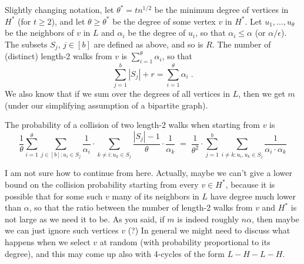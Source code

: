 \documentclass{article}
\newcommand{\eps}{\epsilon}
\begin{document}
Slightly changing notation, let $\theta^* = tn^{1/2}$ be the minimum degree of vertices in $H^*$ (for $t \geq 2$), and let $\theta \geq \theta^*$ be the degree of some vertex $v$ in $H^*$. Let $u_1,\dots,u_\theta$ be the neighbors of $v$ in $L$ and $\alpha_i$ be the degree of  $u_i$, so that $\alpha_i \leq \alpha$ (or $\alpha/\eps$). The subsets $S_j$, $j \in [b]$ are defined as above, and so is $R$.
The number of (distinct) length-2 walks from $v$ is $\sum_{i=1}^\theta \alpha_i$, so that 
\begin{equation}\label{eq:num-of-walks-gen}
\sum_{j=1}^b |S_j| + r = \sum_{i=1}^\theta \alpha_i\;.
\end{equation}
We also know that if we sum over the degrees of all vertices in $L$, then we get $m$ (under our simplifying assumption of a bipartite graph).

The probability of a collision of two length-2 walks when starting from $v$ is
%
\begin{equation}
\frac{1}{\theta}\sum_{i=1}^{\theta}  \sum_{j\in [b]: u_i \in S_j} \frac{1}{\alpha_i} \cdot 
\sum_{k\neq i: u_k \in S_j} \frac{|S_j|-1}{\theta}\cdot \frac{1}{\alpha_k} \;=\; \frac{1}{\theta^2} 
\cdot \sum_{j=1}^b \sum_{i\neq k: u_i,u_k\in S_j} \frac{1}{\alpha_i\cdot\alpha_k}
\label{eq:col-prob-gen}
\end{equation}

I am not sure how to continue from here. Actually, maybe we can't give a lower bound on the collision probability starting from every $v \in H^*$, because it is possible that for some such $v$ many of its neighbors in $L$ have degree much lower than $\alpha$, so that the ratio between the number of length-2 walks from $v$ and $H^*$ is not large as we need it to be. As you said, if $m$ is indeed roughly $n\alpha$, then maybe we can just ignore such vertices $v$ (?)
In general we might need to discuss what happens when we select $v$ at random (with probability proportional to its degree), and this may come up also with 4-cycles of the form $L-H-L-H$.
\end{document}
